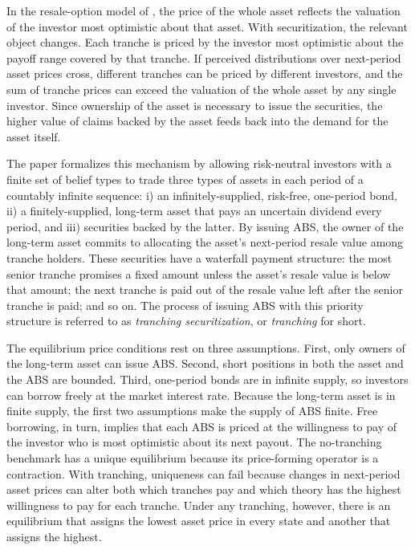 \documentclass[11pt]{article}
\theoremstyle{plain}
\begin{document}
In the resale-option model of \cite{HarrisonKreps1978}, the price of the whole asset reflects the valuation of the investor most optimistic about that asset. With securitization, the relevant object changes. Each tranche is priced by the investor most optimistic about the payoff range covered by that tranche. If perceived distributions over next-period asset prices cross, different tranches can be priced by different investors, and the sum of tranche prices can exceed the valuation of the whole asset by any single investor. Since ownership of the asset is necessary to issue the securities, the higher value of claims backed by the asset feeds back into the demand for the asset itself.

The paper formalizes this mechanism by allowing risk-neutral investors with a finite set of belief types to trade three types of assets in each period of a countably infinite sequence: i) an infinitely-supplied, risk-free, one-period bond, ii) a finitely-supplied, long-term asset that pays an uncertain dividend every period, and iii) securities backed by the latter. By issuing ABS, the owner of the long-term asset commits to allocating the asset's next-period resale value among tranche holders. These securities have a waterfall payment structure: the most senior tranche promises a fixed amount unless the asset's resale value is below that amount; the next tranche is paid out of the resale value left after the senior tranche is paid; and so on. The process of issuing ABS with this priority structure is referred to as \textit{tranching securitization}, or \textit{tranching} for short.

The equilibrium price conditions rest on three assumptions. First, only owners of the long-term asset can issue ABS. Second, short positions in both the asset and the ABS are bounded. Third, one-period bonds are in infinite supply, so investors can borrow freely at the market interest rate. Because the long-term asset is in finite supply, the first two assumptions make the supply of ABS finite. Free borrowing, in turn, implies that each ABS is priced at the willingness to pay of the investor who is most optimistic about its next payout. The no-tranching benchmark has a unique equilibrium because its price-forming operator is a contraction. With tranching, uniqueness can fail because changes in next-period asset prices can alter both which tranches pay and which theory has the highest willingness to pay for each tranche. Under any tranching, however, there is an equilibrium that assigns the lowest asset price in every state and another that assigns the highest.
\end{document}
